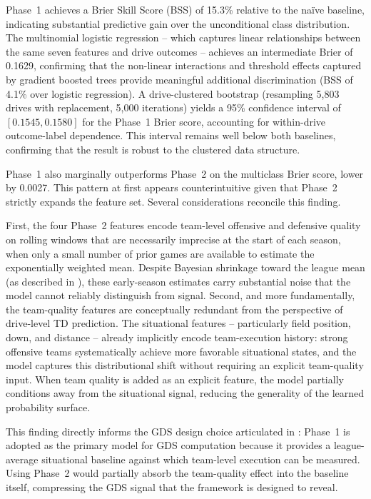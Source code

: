 Phase~1 achieves a Brier Skill Score (BSS) of 15.3\% relative to the
na\"{i}ve baseline, indicating substantial predictive gain over the
unconditional class distribution. The multinomial logistic regression -- which
captures linear relationships between the same seven features and drive
outcomes -- achieves an intermediate Brier of 0.1629, confirming that the
non-linear interactions and threshold effects captured by gradient boosted
trees provide meaningful additional discrimination (BSS of 4.1\% over
logistic regression). A drive-clustered bootstrap (resampling 5{,}803 drives
with replacement, 5{,}000 iterations) yields a 95\% confidence interval of
$[0.1545, 0.1580]$ for the Phase~1 Brier score, accounting for within-drive
outcome-label dependence. This interval remains well below both baselines,
confirming that the result is robust to the clustered data structure.

Phase~1 also marginally outperforms Phase~2 on the multiclass
Brier score, lower by 0.0027. This pattern at first appears counterintuitive
given that Phase~2 strictly expands the feature set. Several considerations
reconcile this finding.

First, the four Phase~2 features encode team-level offensive and defensive
quality on rolling windows that are necessarily imprecise at the start of
each season, when only a small number of prior games are available to estimate
the exponentially weighted mean. Despite Bayesian shrinkage toward the
league mean (as described in ), these early-season estimates
carry substantial noise that the model cannot reliably distinguish from signal.
Second, and more fundamentally, the team-quality features are conceptually
redundant from the perspective of drive-level TD prediction. The situational
features -- particularly field position, down, and distance -- already implicitly
encode team-execution history: strong offensive teams systematically achieve
more favorable situational states, and the model captures this distributional
shift without requiring an explicit team-quality input. When team quality is
added as an explicit feature, the model partially conditions away from the
situational signal, reducing the generality of the learned probability surface.

This finding directly informs the GDS design choice articulated in
: Phase~1 is adopted as the primary \xscore{}
model for GDS computation because it provides a league-average situational
baseline against which team-level execution can be measured. Using Phase~2
would partially absorb the team-quality effect into the baseline itself,
compressing the GDS signal that the framework is designed to reveal.

